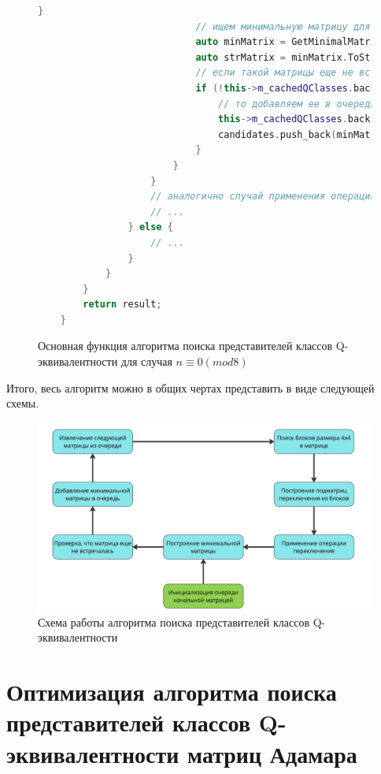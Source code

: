 \begin{figure}[H]
\begin{minipage}{\linewidth}
\begin{lstlisting}[language=c++, tabsize=2, showspaces=false, basicstyle=\fontsize{8}{9}\selectfont, numbers=none]
                            }
                            // ищем минимальную матрицу для построенной новой матрицы
                            auto minMatrix = GetMinimalMatrix(newMatrix);
                            auto strMatrix = minMatrix.ToString();
                            // если такой матрицы еще не встречалось
                            if (!this->m_cachedQClasses.back().count(strMatrix)) {
                                // то добавляем ее в очередь обработки
                                this->m_cachedQClasses.back().insert(strMatrix);
                                candidates.push_back(minMatrix);
                            }
                        }
                    }
                    // аналогично случай применения операции переключения для столбцов
                    // ...
                } else {
                    // ...
                }
            }
        }
        return result;
    }
    \end{lstlisting}
    \end{minipage}
    \caption{Основная функция алгоритма поиска представителей классов Q-эквивалентности для случая $n \equiv 0(mod8)$}
    \label{alg:q_finder}
\end{figure}

Итого, весь алгоритм можно в общих чертах представить в виде следующей схемы.

\begin{figure}[H]
    \centering
    \includegraphics[scale=0.17]{res/img/plot_algo.jpg}
    \caption{Схема работы алгоритма поиска представителей классов Q-эквивалентности}
    \label{fig:algo}
\end{figure}

\section{Оптимизация алгоритма поиска представителей классов Q-эквивалентности матриц Адамара}

